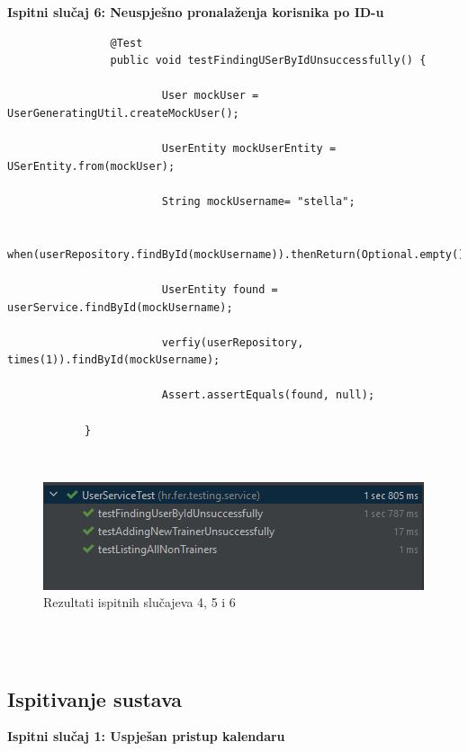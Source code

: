 			\textbf{Ispitni slučaj 6: Neuspješno pronalaženja korisnika po ID-u}\\
		
			\begin{verbatim}
				@Test
				public void testFindingUSerByIdUnsuccessfully() {
						
						User mockUser = UserGeneratingUtil.createMockUser();
						
						UserEntity mockUserEntity = USerEntity.from(mockUser);
						
						String mockUsername= "stella";
						
						when(userRepository.findById(mockUsername)).thenReturn(Optional.empty());
						
						UserEntity found = userService.findById(mockUsername);
						
						verfiy(userRepository, times(1)).findById(mockUsername);
						
						Assert.assertEquals(found, null);
							
			}
			\end{verbatim}\\
		
				\begin{figure}[H]
				\includegraphics[scale=1]{dijagrami/6.png} %
				\centering
				\caption{Rezultati ispitnih slučajeva 4, 5 i 6}
				\label{fig:ispitnislucaj3rez}
			\end{figure}\\\\
			
			\subsection{Ispitivanje sustava}
				
				\textbf{Ispitni slučaj 1: Uspješan pristup kalendaru}
				
